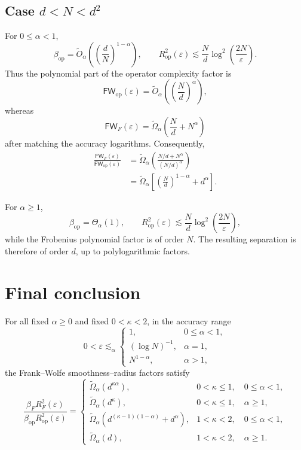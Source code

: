 \documentclass[11pt]{article}
\newcommand{\op}{\mathrm{op}}
\newcommand{\FW}{\mathsf{FW}}
\newcommand{\eps}{\varepsilon}
\begin{document}
\subsection*{Case \(d<N<d^2\)}

For $0\le\alpha<1$,
\[
\beta_{\op} = \widetilde O_\alpha\left( \left(\frac dN\right)^{1-\alpha} \right), \qquad R_{\op}^2(\eps) \lesssim \frac Nd \log^2\left(\frac{2N}{\eps}\right).
\]
Thus the polynomial part of the operator complexity factor is
\[
\FW_{\op}(\eps) = \widetilde O_\alpha\left( \left(\frac Nd\right)^\alpha \right),
\]
whereas
\[
\FW_F(\eps) = \widetilde\Omega_\alpha\left( \frac Nd+N^\alpha \right)
\]
after matching the accuracy logarithms. Consequently,
\begin{align*}
\frac{\FW_F(\eps)}{\FW_{\op}(\eps)}
&= \widetilde\Omega_\alpha\left( \frac{N/d+N^\alpha}{(N/d)^\alpha} \right)\\
&= \widetilde\Omega_\alpha\left[ \left(\frac Nd\right)^{1-\alpha} +d^\alpha \right].
\end{align*}

For $\alpha\ge1$,
\[
\beta_{\op}=\Theta_\alpha(1), \qquad R_{\op}^2(\eps) \lesssim \frac Nd \log^2\left(\frac{2N}{\eps}\right),
\]
while the Frobenius polynomial factor is of order $N$.
The resulting separation is therefore of order $d$, up to
polylogarithmic factors.

\section{Final conclusion}

For all fixed $\alpha\ge0$ and fixed $0<\kappa<2$, in the accuracy
range
\[
0<\eps\lesssim_\alpha
\begin{cases}
1, & 0\le\alpha<1,\\
(\log N)^{-1}, & \alpha=1,\\
N^{1-\alpha}, & \alpha>1,
\end{cases}
\]
the Frank--Wolfe smoothness--radius factors satisfy
\begin{equation}
\boxed{
\frac{\beta_FR_F^2(\eps)} {\beta_{\op}R_{\op}^2(\eps)} =
\begin{cases}
\widetilde\Omega_\alpha(d^{\kappa\alpha}), & 0<\kappa\le1,\quad 0\le\alpha<1, \\[2mm]
\widetilde\Omega_\alpha(d^\kappa), & 0<\kappa\le1,\quad \alpha\ge1, \\[2mm]
\widetilde\Omega_\alpha\left( d^{(\kappa-1)(1-\alpha)}+d^\alpha \right), & 1<\kappa<2,\quad 0\le\alpha<1, \\[2mm]
\widetilde\Omega_\alpha(d), & 1<\kappa<2,\quad \alpha\ge1.
\end{cases}
}
\end{equation}
\end{document}
